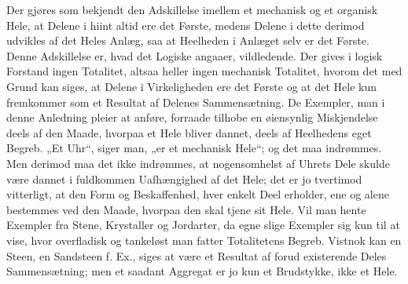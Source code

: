 \documentclass[11pt]{book}
\newcommand{\opage}[1]{\marginnote{\footnotesize\textit{[#1]}}}
\begin{document}
Der gjøres som bekjendt den Adskillelse imellem et mechanisk og et organisk
Hele, at Delene i hiint altid ere det
\opage{128} \setcounter{footnote}{0}%
Første, medens Delene i dette derimod udvikles af det Heles Anlæg, saa at
Heelheden i Anlæget selv er det Første. Denne Adskillelse er, hvad det
Logiske angaaer, vildledende. Der gives i logisk Forstand ingen Totalitet,
altsaa heller ingen mechanisk Totalitet, hvorom det med Grund kan siges, at
Delene i Virkeligheden ere det Første og at det Hele kun fremkommer som et
Resultat af Delenes Sammensætning. De Exempler, man i denne Anledning pleier
at anføre, forraade tilhobe en øiensynlig Miskjendelse deels af den Maade,
hvorpaa et Hele bliver dannet, deels af Heelhedens eget Begreb. „Et Uhr“,
siger man, „er et mechanisk Hele“; og det maa indrømmes. Men derimod maa det
ikke indrømmes, at nogensomhelst af Uhrets Dele skulde være dannet i
fuldkommen Uafhængighed af det Hele; det er jo tvertimod vitterligt, at den
Form og Beskaffenhed, hver enkelt Deel erholder, ene og alene bestemmes ved
den Maade, hvorpaa den skal tjene sit Hele. Vil man hente Exempler fra Stene,
Krystaller og Jordarter, da egne slige Exempler sig kun til at vise, hvor
overfladisk og tankeløst man fatter Totalitetens Begreb. Vistnok kan en Steen,
en Sandsteen f. Ex., siges at være et Resultat af forud existerende Deles
Sammensætning; men et saadant Aggregat er jo kun et Brudstykke, ikke et Hele.
\end{document}
